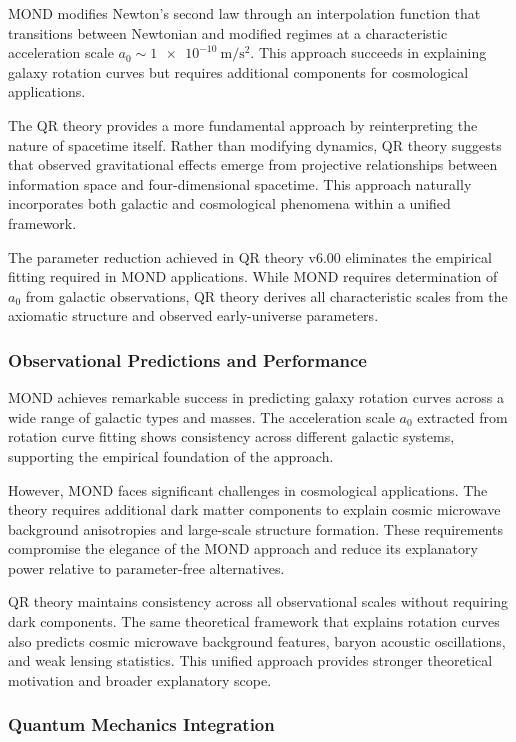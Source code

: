 MOND modifies Newton’s second law through an interpolation function that transitions between Newtonian and modified regimes at a characteristic acceleration scale $a_0 \sim \qty{1e-10}{\metre\per\second\squared}$. This approach succeeds in explaining galaxy rotation curves but requires additional components for cosmological applications.

The QR theory provides a more fundamental approach by reinterpreting the nature of spacetime itself. Rather than modifying dynamics, QR theory suggests that observed gravitational effects emerge from projective relationships between information space and four-dimensional spacetime. This approach naturally incorporates both galactic and cosmological phenomena within a unified framework.

The parameter reduction achieved in QR theory v6.00 eliminates the empirical fitting required in MOND applications. While MOND requires determination of $a_0$ from galactic observations, QR theory derives all characteristic scales from the axiomatic structure and observed early-universe parameters.

\subsubsection{Observational Predictions and Performance}
\label{subsubsec:observational-mond}

MOND achieves remarkable success in predicting galaxy rotation curves across a wide range of galactic types and masses. The acceleration scale $a_0$ extracted from rotation curve fitting shows consistency across different galactic systems, supporting the empirical foundation of the approach.

However, MOND faces significant challenges in cosmological applications. The theory requires additional dark matter components to explain cosmic microwave background anisotropies and large-scale structure formation. These requirements compromise the elegance of the MOND approach and reduce its explanatory power relative to parameter-free alternatives.

QR theory maintains consistency across all observational scales without requiring dark components. The same theoretical framework that explains rotation curves also predicts cosmic microwave background features, baryon acoustic oscillations, and weak lensing statistics. This unified approach provides stronger theoretical motivation and broader explanatory scope.

\subsubsection{Quantum Mechanics Integration}
\label{subsubsec:quantum-integration-mond}

